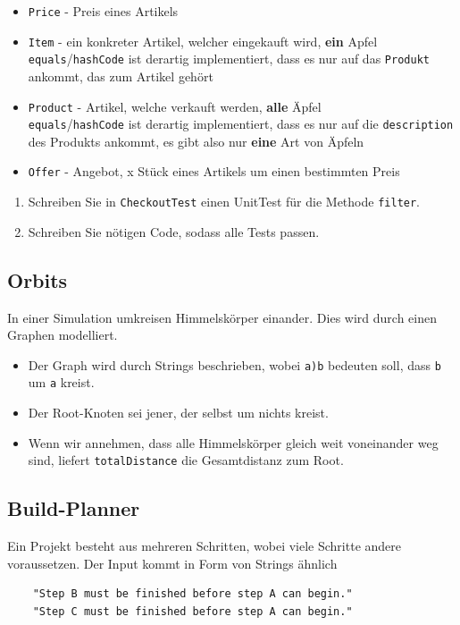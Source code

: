 \begin{itemize}
	\item \texttt{Price} - Preis eines Artikels
	\item \texttt{Item} - ein konkreter Artikel, welcher eingekauft wird, \textbf{ein} Apfel \\
	\texttt{equals}/\texttt{hashCode} ist derartig implementiert, dass es nur auf das \texttt{Produkt} ankommt, das zum Artikel gehört
	\item \texttt{Product} - Artikel, welche verkauft werden, \textbf{alle} Äpfel \\
	\texttt{equals}/\texttt{hashCode} ist derartig implementiert, dass es nur auf die \texttt{description} des Produkts ankommt, es gibt also nur \textbf{eine} Art von Äpfeln
	\item \texttt{Offer} - Angebot, x Stück eines Artikels um einen bestimmten Preis
\end{itemize}

\begin{enumerate}
	\item Schreiben Sie in \texttt{CheckoutTest} einen UnitTest für die Methode \texttt{filter}.
	\item Schreiben Sie nötigen Code, sodass alle Tests passen.
\end{enumerate}

\subsection{Orbits}
In einer Simulation umkreisen Himmelskörper einander. Dies wird durch einen Graphen modelliert. 
\begin{itemize}
	\item Der Graph wird durch Strings beschrieben, wobei \texttt{a)b} bedeuten soll, dass \texttt{b} um \texttt{a} kreist.
	\item Der Root-Knoten sei jener, der selbst um nichts kreist.
	\item Wenn wir annehmen, dass alle Himmelskörper gleich weit voneinander weg sind, liefert \texttt{totalDistance} die Gesamtdistanz zum Root.
\end{itemize}

\subsection{Build-Planner}
Ein Projekt besteht aus mehreren Schritten, wobei viele Schritte andere voraussetzen. Der Input kommt in Form von Strings ähnlich
\begin{verbatim}
	"Step B must be finished before step A can begin."
	"Step C must be finished before step A can begin."
\end{verbatim}

